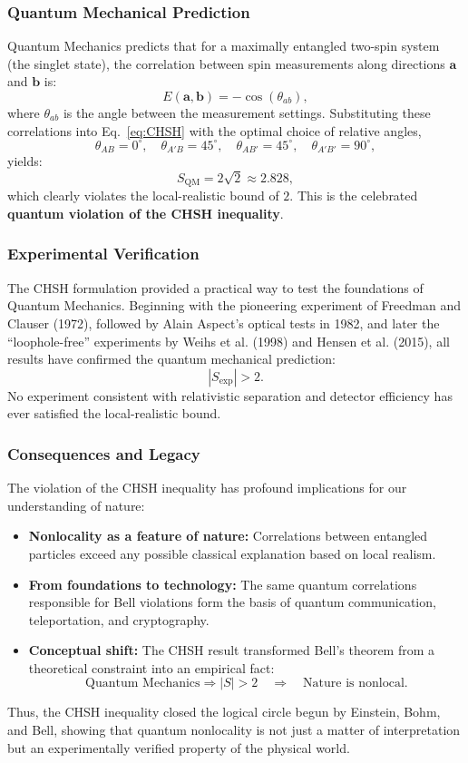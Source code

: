 \subsubsection{Quantum Mechanical Prediction}

Quantum Mechanics predicts that for a maximally entangled two-spin system (the singlet state), the correlation between spin measurements along directions $\mathbf{a}$ and $\mathbf{b}$ is:
\[
E(\mathbf{a},\mathbf{b}) = -\cos(\theta_{ab}),
\]
where $\theta_{ab}$ is the angle between the measurement settings.  
Substituting these correlations into Eq.~\eqref{eq:CHSH} with the optimal choice of relative angles,
\[
\theta_{AB} = 0^\circ, \quad
\theta_{A'B} = 45^\circ, \quad
\theta_{AB'} = 45^\circ, \quad
\theta_{A'B'} = 90^\circ,
\]
yields:
\[
S_{\text{QM}} = 2\sqrt{2} \approx 2.828,
\]
which clearly violates the local-realistic bound of $2$.  
This is the celebrated \textbf{quantum violation of the CHSH inequality}.

\subsubsection{Experimental Verification}

The CHSH formulation provided a practical way to test the foundations of Quantum Mechanics.  
Beginning with the pioneering experiment of Freedman and Clauser (1972), followed by Alain Aspect’s optical tests in 1982, and later the ``loophole-free'' experiments by Weihs et al. (1998) and Hensen et al. (2015), all results have confirmed the quantum mechanical prediction:
\[
|S_{\text{exp}}| > 2.
\]
No experiment consistent with relativistic separation and detector efficiency has ever satisfied the local-realistic bound.

\subsubsection{Consequences and Legacy}

The violation of the CHSH inequality has profound implications for our understanding of nature:

\begin{itemize}
    \item \textbf{Nonlocality as a feature of nature:}  
    Correlations between entangled particles exceed any possible classical explanation based on local realism.
    
    \item \textbf{From foundations to technology:}  
    The same quantum correlations responsible for Bell violations form the basis of quantum communication, teleportation, and cryptography.
    
    \item \textbf{Conceptual shift:}  
    The CHSH result transformed Bell’s theorem from a theoretical constraint into an empirical fact:  
    \[
    \text{Quantum Mechanics} \Rightarrow |S| > 2 \quad \Longrightarrow \quad \text{Nature is nonlocal.}
    \]
\end{itemize}

Thus, the CHSH inequality closed the logical circle begun by Einstein, Bohm, and Bell, showing that quantum nonlocality is not just a matter of interpretation but an experimentally verified property of the physical world.
